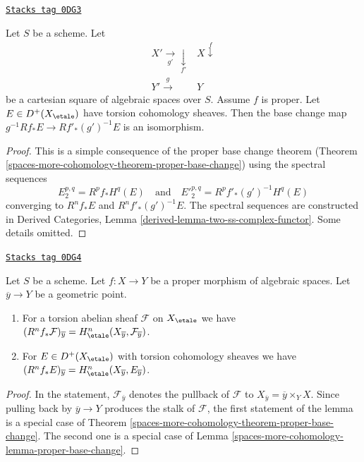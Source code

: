 \begin{lemma}
\label{spaces-more-cohomology-lemma-proper-base-change}
\href{https://stacks.math.columbia.edu/tag/0DG3}{\texttt{Stacks tag 0DG3}}

Let $S$ be a scheme. Let
$$
\begin{array}{cc}X' \underset{g'}{\longrightarrow}\underset{f'}{\downarrow} & X \overset{f}{\downarrow} \\ Y' \overset{g}{\longrightarrow} & Y\end{array}
$$
be a cartesian square of algebraic spaces over $S$. Assume $f$ is proper.
Let $E \in D^+(X_\etale)$ have torsion cohomology sheaves.
Then the base change map $g^{-1}Rf_*E \to Rf'_*(g')^{-1}E$
is an isomorphism.
\end{lemma}

\begin{proof}
This is a simple consequence of the proper base change theorem
(Theorem \ref{spaces-more-cohomology-theorem-proper-base-change}) using the spectral
sequences
$$
E_2^{p, q} = R^pf_*H^q(E)
\quad\text{and}\quad
{E'}_2^{p, q} = R^pf'_*(g')^{-1}H^q(E)
$$
converging to $R^nf_*E$ and $R^nf'_*(g')^{-1}E$.
The spectral sequences are constructed in
Derived Categories, Lemma \ref{derived-lemma-two-ss-complex-functor}.
Some details omitted.
\end{proof}

\begin{lemma}
\label{spaces-more-cohomology-lemma-proper-base-change-stalk}
\href{https://stacks.math.columbia.edu/tag/0DG4}{\texttt{Stacks tag 0DG4}}

Let $S$ be a scheme.
Let $f : X \to Y$ be a proper morphism of algebraic spaces.
Let $\overline{y} \to Y$ be a geometric point.
\begin{enumerate}
\item For a torsion abelian sheaf $\mathcal{F}$ on $X_\etale$ we have
$(R^nf_*\mathcal{F})_{\overline{y}} =
H^n_\etale(X_{\overline{y}}, \mathcal{F}_{\overline{y}})$.
\item For $E \in D^+(X_\etale)$ with torsion cohomology sheaves we have
$(R^nf_*E)_{\overline{y}} = H^n_\etale(X_{\overline{y}}, E_{\overline{y}})$.
\end{enumerate}
\end{lemma}

\begin{proof}
In the statement, $\mathcal{F}_{\overline{y}}$ denotes the pullback
of $\mathcal{F}$ to $X_{\overline{y}} = \overline{y} \times_Y X$.
Since pulling back by $\overline{y} \to Y$ produces the
stalk of $\mathcal{F}$, the first statement of the lemma
is a special case of Theorem \ref{spaces-more-cohomology-theorem-proper-base-change}.
The second one is a special case of Lemma \ref{spaces-more-cohomology-lemma-proper-base-change}.
\end{proof}

